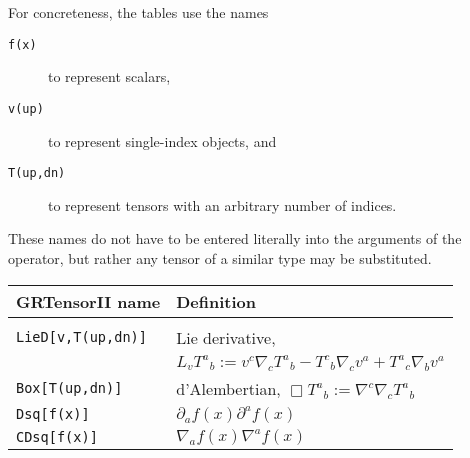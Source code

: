 \documentclass{article}
\begin{document}
{{{For concreteness, the tables use the names
\begin{description}
  \item[\texttt{f(x)}] to represent scalars,
  \item[\texttt{v(up)}] to represent single-index objects, and
  \item[\texttt{T(up,dn)}] to represent tensors with an arbitrary number
    of indices.
\end{description}
These names do not have to be entered literally into the arguments of
the operator, but rather any tensor of a similar type may be substituted.\\

\renewcommand{\baselinestretch}{1.5}\normalsize
\begin{center}
\begin{tabular}{lp{}}\hline\hline
GRTensorII name & Definition\\ \hline
& \\
\texttt{LieD[v,T(up,dn)]}	& Lie derivative,\\
			 	& $L_v T^a{}_b := v^c \nabla_c T^a{}_b
				-T^c{}_b\nabla_c v^a + T^a{}_c\nabla_b v^a$ \\
\texttt{Box[T(up,dn)]}		& d'Alembertian, 
				$\Box T^a{}_b := \nabla^c \nabla_c T^a{}_b$\\
\texttt{Dsq[f(x)]}		& $\partial_a f(x) \partial^a f(x)$\\
\texttt{CDsq[f(x)]}		& $\nabla_a f(x) \nabla^a f(x)$\\
\hline
\end{tabular}
\renewcommand{\baselinestretch}{1}\normalsize
\end{center}

}}}
\end{document}
